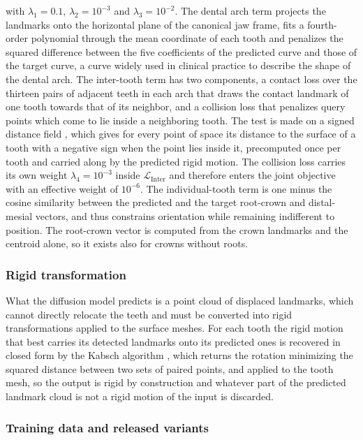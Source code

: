 \documentclass[10pt,a4paper]{article}
\begin{document}
with $\lambda_1 = 0.1$, $\lambda_2 = 10^{-3}$ and $\lambda_3 = 10^{-2}$. The dental arch term projects the landmarks onto the horizontal plane of the canonical jaw frame, fits a fourth-order polynomial through the mean coordinate of each tooth and penalizes the squared difference between the five coefficients of the predicted curve and those of the target curve, a curve widely used in clinical practice to describe the shape of the dental arch. The inter-tooth term has two components, a contact loss over the thirteen pairs of adjacent teeth in each arch that draws the contact landmark of one tooth towards that of its neighbor, and a collision loss that penalizes query points which come to lie inside a neighboring tooth. The test is made on a signed distance field \citep{park2019deepsdf}, which gives for every point of space its distance to the surface of a tooth with a negative sign when the point lies inside it, precomputed once per tooth and carried along by the predicted rigid motion. The collision loss carries its own weight $\lambda_4 = 10^{-3}$ inside $\mathcal{L}_{\text{Inter}}$ and therefore enters the joint objective with an effective weight of $10^{-6}$. The individual-tooth term is one minus the cosine similarity between the predicted and the target root-crown and distal-mesial vectors, and thus constrains orientation while remaining indifferent to position. The root-crown vector is computed from the crown landmarks and the centroid alone, so it exists also for crowns without roots.

\subsubsection{Rigid transformation}

What the diffusion model predicts is a point cloud of displaced landmarks, which cannot directly relocate the teeth and must be converted into rigid transformations applied to the surface meshes. For each tooth the rigid motion that best carries its detected landmarks onto its predicted ones is recovered in closed form by the Kabsch algorithm \citep{kabsch1976}, which returns the rotation minimizing the squared distance between two sets of paired points, and applied to the tooth mesh, so the output is rigid by construction and whatever part of the predicted landmark cloud is not a rigid motion of the input is discarded.

\subsubsection{Training data and released variants}
\end{document}
